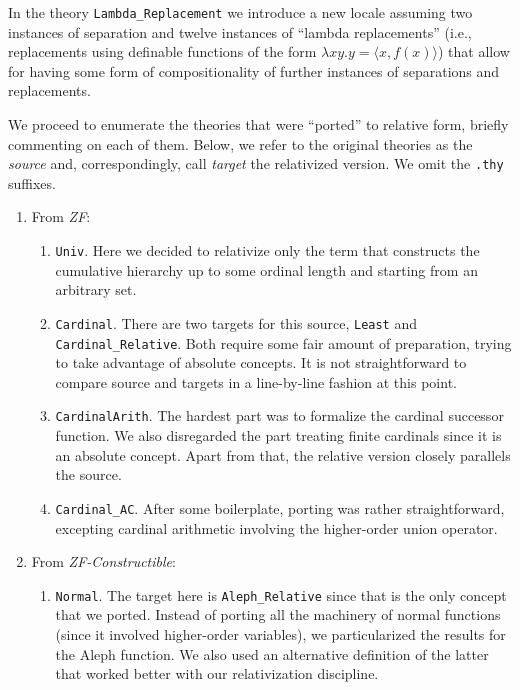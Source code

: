 \documentclass[11pt,a4paper,english]{article}
\newcommand{\session}[1]{\textit{#1}}
\newcommand{\theory}[1]{\texttt{#1}}
\begin{document}
In the theory \theory{Lambda\_Replacement} we introduce a new locale assuming
two instances of separation and twelve instances of ``lambda replacements''
(i.e., replacements using definable functions of the form $\lambda x y. y=\langle x, f(x) \rangle$)
that allow for having some form of compositionality of further instances
of separations and replacements.

We proceed to enumerate the theories that were ``ported'' to relative
form, briefly commenting on each of them. Below, we refer to the
original theories as the \emph{source} and, correspondingly, call
\emph{target} the relativized version. We omit the \theory{.thy}
suffixes.

\begin{enumerate}
\item From \session{ZF}:
  \begin{enumerate}
  \item \theory{Univ}. Here we decided to relativize only the term
     that constructs the cumulative hierarchy up to some
    ordinal length and starting from an arbitrary set.
  \item \theory{Cardinal}. There are two targets for this source,
    \theory{Least} and \theory{Cardinal\_Relative}. Both require some
    fair amount of preparation, trying to take advantage of absolute
    concepts. It is not straightforward to compare source and targets
    in a line-by-line fashion at this point.
  \item \theory{CardinalArith}. The hardest part was to formalize the
    cardinal successor function. We also disregarded the part treating
    finite cardinals since it is an absolute concept. Apart from that,
    the relative version closely parallels the source.
  \item \theory{Cardinal\_AC}. After some boilerplate, porting was
    rather straightforward, excepting cardinal arithmetic involving
    the higher-order union operator.
  \end{enumerate}
\item From \session{ZF-Constructible}:
  \begin{enumerate}
  \item \theory{Normal}. The target here is \theory{Aleph\_Relative}
    since that is the only concept that we ported. Instead of porting
    all the machinery of normal functions (since it involved
    higher-order variables), we particularized the results for the
    Aleph function. We also used an alternative definition of the
    latter that worked better with our relativization discipline.

\end{enumerate}
\end{enumerate}
\end{document}
